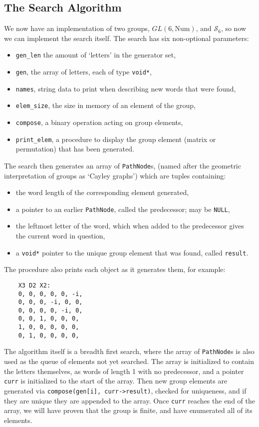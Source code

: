 \subsection{The Search Algorithm}
We now have an implementation of two groups, $GL(6, \text{Num})$, and $\mathcal{S}_6$, so now we can implement the search itself. The search has six non-optional parameters:
\begin{itemize}
	\item \verb`gen_len` the amount of `letters' in the generator set,
	\item \verb`gen`, the array of letters, each of type \verb`void*`,
	\item \verb`names`, string data to print when describing new words that were found,
	\item \verb`elem_size`, the size in memory of an element of the group,
	\item \verb`compose`, a binary operation acting on group elements,
	\item \verb`print_elem`, a procedure to display the group element (matrix or permutation) that has been generated.
\end{itemize}
The search then generates an array of \verb`PathNode`s, (named after the geometric interpretation of groups as `Cayley graphs') which are tuples containing:
\begin{itemize}
	\item the word length of the corresponding element generated,
	\item a pointer to an earlier \verb`PathNode`, called the predecessor; may be \verb`NULL`,
	\item the leftmost letter of the word, which when added to the predecessor gives the current word in question,
	\item a \verb`void*` pointer to the unique group element that was found, called \verb`result`.
\end{itemize}
The procedure also prints each object as it generates them, for example:
\begin{verbatim}
	X3 D2 X2:
	0, 0, 0, 0, 0, -i, 
	0, 0, 0, -i, 0, 0, 
	0, 0, 0, 0, -i, 0, 
	0, 0, 1, 0, 0, 0, 
	1, 0, 0, 0, 0, 0, 
	0, 1, 0, 0, 0, 0, 
\end{verbatim}

The algorithm itself is a breadth first search, where the array of \verb`PathNode`s is also used as the queue of elements not yet searched. The array is initialized to contain the letters themselves, as words of length 1 with no predecessor, and a pointer \verb`curr` is initialized to the start of the array. Then new group elements are generated via \verb`compose(gen[i], curr->result)`, checked for uniqueness, and if they are unique they are appended to the array. Once \verb`curr` reaches the end of the array, we will have proven that the group is finite, and have enumerated all of its elements.

